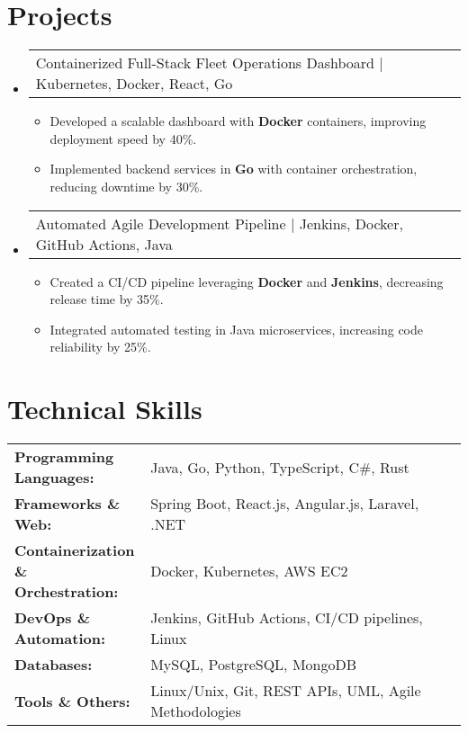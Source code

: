 \documentclass[letterpaper,11pt]{article}
\makeatletter
\newcommand{\resumeItem}[1]{
  \item\footnotesize{
    {#1 \vspace{-2pt}}
  }
}
\newcommand{\resumeProjectHeading}[2]{
    \item
    \begin{tabular*}{1.001\textwidth}{l@{\extracolsep{\fill}}r}
      \small#1 & \textbf{\small #2}\\
    \end{tabular*}\vspace{-7pt}
}
\newcommand{\resumeSubHeadingListStart}{\begin{itemize}[leftmargin=0pt, label={}]}
\newcommand{\resumeSubHeadingListEnd}{\end{itemize}}
\newcommand{\resumeItemListStart}{\begin{itemize}[leftmargin=*]}
\newcommand{\resumeItemListEnd}{\end{itemize}\vspace{-5pt}}
\makeatother
\begin{document}
\section{Projects}
    \vspace{-5pt}
    \resumeSubHeadingListStart
      \resumeProjectHeading
          {Containerized Full-Stack Fleet Operations Dashboard | Kubernetes, Docker, React, Go}{}
          \resumeItemListStart
              \resumeItem{Developed a scalable dashboard with \textbf{Docker} containers, improving deployment speed by 40\%.}
              \resumeItem{Implemented backend services in \textbf{Go} with container orchestration, reducing downtime by 30\%.}
          \resumeItemListEnd
          \vspace{-16pt}
      \resumeProjectHeading
          {Automated Agile Development Pipeline | Jenkins, Docker, GitHub Actions, Java}{}
          \resumeItemListStart
              \resumeItem{Created a CI/CD pipeline leveraging \textbf{Docker} and \textbf{Jenkins}, decreasing release time by 35\%.}
              \resumeItem{Integrated automated testing in Java microservices, increasing code reliability by 25\%.}
          \resumeItemListEnd
          \vspace{-16pt}
    \resumeSubHeadingListEnd
\vspace{-10pt}
\section{Technical Skills}
        \vspace{-14pt}
        \begin{table}[h]
            \footnotesize
            \begin{tabular}{p{0.3\linewidth} p{0.7\linewidth}}
                \textbf{Programming Languages:} & Java, Go, Python, TypeScript, C\#, Rust \\
                \textbf{Frameworks \& Web:} & Spring Boot, React.js, Angular.js, Laravel, .NET \\
                \textbf{Containerization \& Orchestration:} & Docker, Kubernetes, AWS EC2 \\
                \textbf{DevOps \& Automation:} & Jenkins, GitHub Actions, CI/CD pipelines, Linux \\
                \textbf{Databases:} & MySQL, PostgreSQL, MongoDB \\
                \textbf{Tools \& Others:} & Linux/Unix, Git, REST APIs, UML, Agile Methodologies \\
            \end{tabular}
        \end{table}
\end{document}
